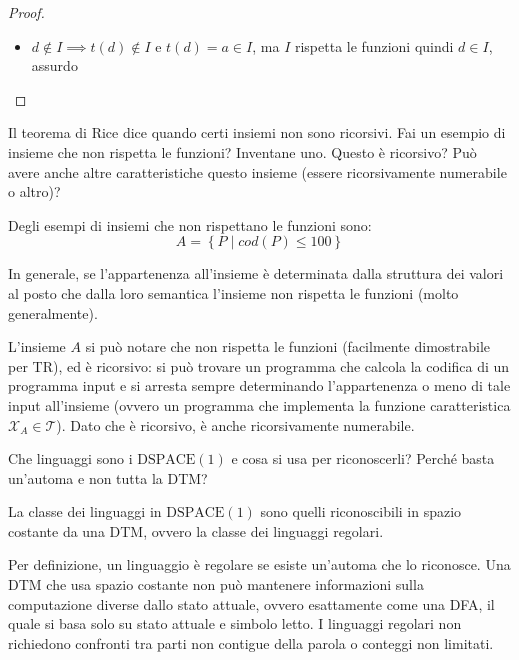 \documentclass[12pt, answers]{exam}
\theoremstyle{plain}
\newcommand{\dspace}{\text{DSPACE}}
\newcommand{\T}{\mathcal{T}}
\newcommand{\X}{\mathcal{X}}
\begin{document}
\begin{questions}
\begin{solution}
\begin{proof}
\begin{itemize}
                    \item $d \notin I \implies t(d) \notin I$ e $t(d) = a \in I$, ma $I$ rispetta le funzioni quindi $d \in I$, assurdo
                \end{itemize}
            \end{proof}
        \end{solution}
        
        \question Il teorema di Rice dice quando certi insiemi non sono ricorsivi. Fai un esempio di insieme che non rispetta le funzioni? Inventane uno. Questo è ricorsivo? Può avere anche altre caratteristiche questo insieme (essere ricorsivamente numerabile o altro)?
        
        \begin{solution}
            Degli esempi di insiemi che non rispettano le funzioni sono:
            $$ A = \left\{ P \mid cod(P) \leq 100 \right\} $$
            
            In generale, se l'appartenenza all'insieme è determinata dalla struttura dei valori al posto che dalla loro semantica l'insieme non rispetta le funzioni (molto generalmente).
            
            L'insieme $A$ si può notare che non rispetta le funzioni (facilmente dimostrabile per TR), ed è ricorsivo: si può trovare un programma che calcola la codifica di un programma input e si arresta sempre determinando l'appartenenza o meno di tale input all'insieme (ovvero un programma che implementa la funzione caratteristica $\X_A \in \T$). Dato che è ricorsivo, è anche ricorsivamente numerabile.
        \end{solution}
        
        \question Che linguaggi sono i $\dspace(1)$ e cosa si usa per riconoscerli? Perché basta un'automa e non tutta la DTM?
        
        \begin{solution}
            La classe dei linguaggi in $\dspace (1)$ sono quelli riconoscibili in spazio costante da una DTM, ovvero la classe dei linguaggi regolari. 
            
            Per definizione, un linguaggio è regolare se esiste un'automa che lo riconosce. Una DTM che usa spazio costante non può mantenere informazioni sulla computazione diverse dallo stato attuale, ovvero esattamente come una DFA, il quale si basa solo su stato attuale e simbolo letto. I linguaggi regolari non richiedono confronti tra parti non contigue della parola o conteggi non limitati.
        \end{solution}
    \end{questions}
\end{document}
